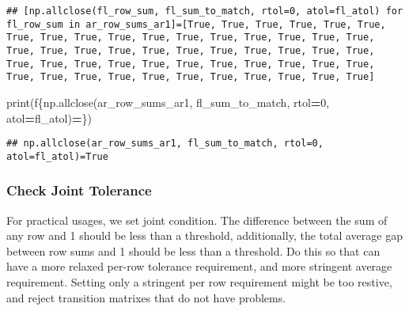 \documentclass[
]{book}
\newenvironment{Shaded}{\begin{snugshade}}{\end{snugshade}}
\newcommand{\BuiltInTok}[1]{#1}
\newcommand{\DecValTok}[1]{\textcolor[rgb]{0.00,0.00,0.81}{#1}}
\newcommand{\NormalTok}[1]{#1}
\newcommand{\OperatorTok}[1]{\textcolor[rgb]{0.81,0.36,0.00}{\textbf{#1}}}
\newcommand{\SpecialCharTok}[1]{\textcolor[rgb]{0.00,0.00,0.00}{#1}}
\newcommand{\SpecialStringTok}[1]{\textcolor[rgb]{0.31,0.60,0.02}{#1}}
\begin{document}
\begin{verbatim}
## [np.allclose(fl_row_sum, fl_sum_to_match, rtol=0, atol=fl_atol) for fl_row_sum in ar_row_sums_ar1]=[True, True, True, True, True, True, True, True, True, True, True, True, True, True, True, True, True, True, True, True, True, True, True, True, True, True, True, True, True, True, True, True, True, True, True, True, True, True, True, True, True, True, True, True, True, True, True, True, True, True]
\end{verbatim}

\begin{Shaded}
\begin{Highlighting}[]
\BuiltInTok{print}\NormalTok{(}\SpecialStringTok{f\textquotesingle{}}\SpecialCharTok{\{np.}\NormalTok{allclose(ar\_row\_sums\_ar1, fl\_sum\_to\_match, rtol}\OperatorTok{=}\DecValTok{0}\NormalTok{, atol}\OperatorTok{=}\NormalTok{fl\_atol)}\OperatorTok{=}\SpecialCharTok{\}}\SpecialStringTok{\textquotesingle{}}\NormalTok{)}
\end{Highlighting}
\end{Shaded}

\begin{verbatim}
## np.allclose(ar_row_sums_ar1, fl_sum_to_match, rtol=0, atol=fl_atol)=True
\end{verbatim}

\hypertarget{check-joint-tolerance}{%
\subsubsection{Check Joint Tolerance}\label{check-joint-tolerance}}

For practical usages, we set joint condition. The difference between the sum of any row and 1 should be less than a threshold, additionally, the total average gap between row sums and 1 should be less than a threshold. Do this so that can have a more relaxed per-row tolerance requirement, and more stringent average requirement. Setting only a stringent per row requirement might be too restive, and reject transition matrixes that do not have problems.
\end{document}
